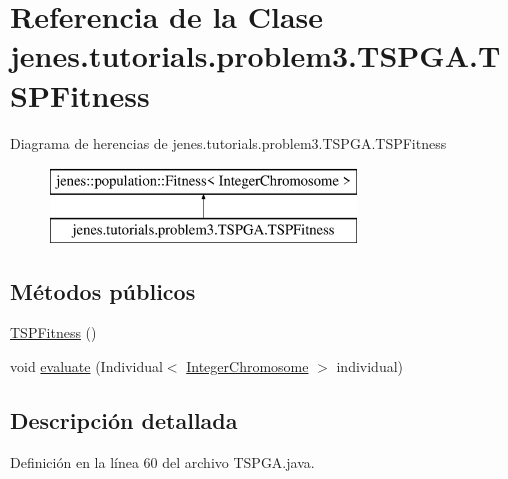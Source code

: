 \hypertarget{classjenes_1_1tutorials_1_1problem3_1_1_t_s_p_g_a_1_1_t_s_p_fitness}{\section{Referencia de la Clase jenes.\-tutorials.\-problem3.\-T\-S\-P\-G\-A.\-T\-S\-P\-Fitness}
\label{classjenes_1_1tutorials_1_1problem3_1_1_t_s_p_g_a_1_1_t_s_p_fitness}
}
Diagrama de herencias de jenes.\-tutorials.\-problem3.\-T\-S\-P\-G\-A.\-T\-S\-P\-Fitness\begin{figure}[H]
\begin{center}
\leavevmode
\includegraphics[height=2.000000cm]{classjenes_1_1tutorials_1_1problem3_1_1_t_s_p_g_a_1_1_t_s_p_fitness}
\end{center}
\end{figure}
\subsection*{Métodos públicos}
\begin{DoxyCompactItemize}
\item 
\hyperlink{classjenes_1_1tutorials_1_1problem3_1_1_t_s_p_g_a_1_1_t_s_p_fitness_a6ddf24c28d9f7acbe66805e67a7f0f04}{T\-S\-P\-Fitness} ()
\item 
void \hyperlink{classjenes_1_1tutorials_1_1problem3_1_1_t_s_p_g_a_1_1_t_s_p_fitness_a8f00a10809ec33af08b8cde4d77810a5}{evaluate} (Individual$<$ \hyperlink{classjenes_1_1chromosome_1_1_integer_chromosome}{Integer\-Chromosome} $>$ individual)
\end{DoxyCompactItemize}


\subsection{Descripción detallada}


Definición en la línea 60 del archivo T\-S\-P\-G\-A.\-java.



